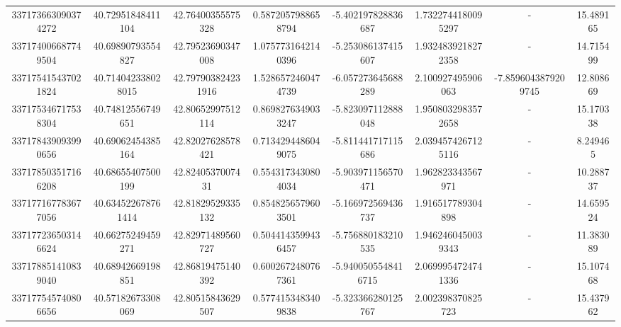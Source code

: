 \documentclass{article}
\begin{document}
\begin{landscape}
\begin{longtable}[c]{S[table-format=18.0]S[table-format=2.15]S[table-format=2.15]S[table-format=-2.17]S[table-format=-2.16]S[table-format=-2.16]S[table-format=-3.16]S[table-format=2.7]}
337173663090374272 & 40.72951848411104  & 42.76400355575328  & 0.5872057988658794    & -5.402197828836687  & 1.7322744180095297 & {-}                  & 15.489165  \\
337174006687749504 & 40.69890793554827  & 42.79523690347008  & 1.0757731642140396    & -5.253086137415607  & 1.9324839218272358 & {-}                  & 14.715499  \\
337175415437021824 & 40.714042338028015 & 42.797903824231916 & 1.5286572460474739    & -6.057273645688289  & 2.100927495906063  & -7.8596043879209745 & 12.808669  \\
337175346717538304 & 40.74812556749651  & 42.80652997512114  & 0.8698276349033247    & -5.823097112888048  & 1.9508032983572658 & {-}                  & 15.170338  \\
337178439093990656 & 40.69062454385164  & 42.82027628578421  & 0.7134294486049075    & -5.811441717115686  & 2.0394574267125116 & {-}                  & 8.249465   \\
337178503517166208 & 40.68655407500199  & 42.8240537007431   & 0.5543173430804034    & -5.903971156570471  & 1.962823343567971  & {-}                  & 10.288737  \\
337177167783677056 & 40.634522678761414 & 42.81829529335132  & 0.8548256579603501    & -5.166972569436737  & 1.916517789304898  & {-}                  & 14.659524  \\
337177236503146624 & 40.66275249459271  & 42.82971489560727  & 0.5044143599436457    & -5.756880183210535  & 1.9462460450039343 & {-}                  & 11.383089  \\
337178851410839040 & 40.68942669198851  & 42.86819475140392  & 0.6002672480767361    & -5.9400505548416715 & 2.0699954724741336 & {-}                  & 15.107468  \\
337177545740806656 & 40.57182673308069  & 42.80515843629507  & 0.5774153483409838    & -5.323366280125767  & 2.002398370825723  & {-}                  & 15.437962 
 \end{longtable}
 

\end{landscape}
\end{document}
